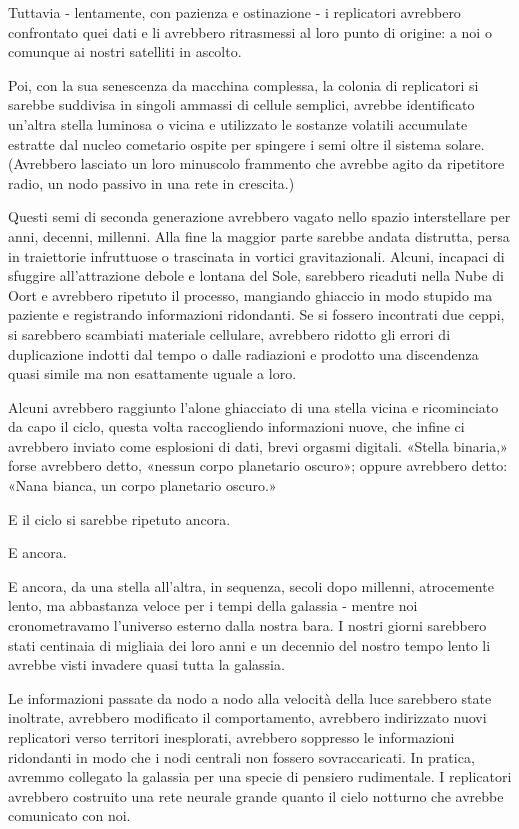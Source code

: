 Tuttavia - lentamente, con pazienza e ostinazione - i replicatori
avrebbero confrontato quei dati e li avrebbero ritrasmessi al loro punto
di origine: a noi o comunque ai nostri satelliti in ascolto.

Poi, con la sua senescenza da macchina complessa, la colonia di
replicatori si sarebbe suddivisa in singoli ammassi di cellule semplici,
avrebbe identificato un'altra stella luminosa o vicina e utilizzato le
sostanze volatili accumulate estratte dal nucleo cometario ospite per
spingere i semi oltre il sistema solare. (Avrebbero lasciato un loro
minuscolo frammento che avrebbe agito da ripetitore radio, un nodo
passivo in una rete in crescita.)

Questi semi di seconda generazione avrebbero vagato nello spazio
interstellare per anni, decenni, millenni. Alla fine la maggior parte
sarebbe andata distrutta, persa in traiettorie infruttuose o trascinata
in vortici gravitazionali. Alcuni, incapaci di sfuggire all'attrazione
debole e lontana del Sole, sarebbero ricaduti nella Nube di Oort e
avrebbero ripetuto il processo, mangiando ghiaccio in modo stupido ma
paziente e registrando informazioni ridondanti. Se si fossero incontrati
due ceppi, si sarebbero scambiati materiale cellulare, avrebbero ridotto
gli errori di duplicazione indotti dal tempo o dalle radiazioni e
prodotto una discendenza quasi simile ma non esattamente uguale a loro.

Alcuni avrebbero raggiunto l'alone ghiacciato di una stella vicina e
ricominciato da capo il ciclo, questa volta raccogliendo informazioni
nuove, che infine ci avrebbero inviato come esplosioni di dati, brevi
orgasmi digitali. «Stella binaria,» forse avrebbero detto, «nessun corpo
planetario oscuro»; oppure avrebbero detto: «Nana bianca, un corpo
planetario oscuro.»

E il ciclo si sarebbe ripetuto ancora.

E ancora.

E ancora, da una stella all'altra, in sequenza, secoli dopo millenni,
atrocemente lento, ma abbastanza veloce per i tempi della galassia -
mentre noi cronometravamo l'universo esterno dalla nostra bara. I nostri
giorni sarebbero stati centinaia di migliaia dei loro anni e un decennio
del nostro tempo lento li avrebbe visti invadere quasi tutta la
galassia.

Le informazioni passate da nodo a nodo alla velocità della luce
sarebbero state inoltrate, avrebbero modificato il comportamento,
avrebbero indirizzato nuovi replicatori verso territori inesplorati,
avrebbero soppresso le informazioni ridondanti in modo che i nodi
centrali non fossero sovraccaricati. In pratica, avremmo collegato la
galassia per una specie di pensiero rudimentale. I replicatori avrebbero
costruito una rete neurale grande quanto il cielo notturno che avrebbe
comunicato con noi.

